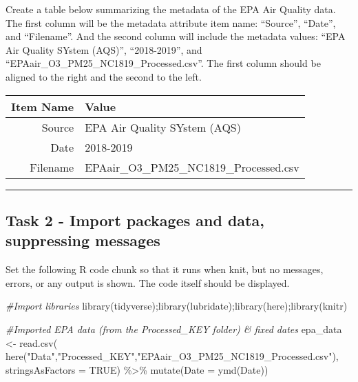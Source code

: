 \documentclass[
]{article}
\newenvironment{Shaded}{\begin{snugshade}}{\end{snugshade}}
\newcommand{\AttributeTok}[1]{\textcolor[rgb]{0.77,0.63,0.00}{#1}}
\newcommand{\CommentTok}[1]{\textcolor[rgb]{0.56,0.35,0.01}{\textit{#1}}}
\newcommand{\ConstantTok}[1]{\textcolor[rgb]{0.00,0.00,0.00}{#1}}
\newcommand{\FunctionTok}[1]{\textcolor[rgb]{0.00,0.00,0.00}{#1}}
\newcommand{\NormalTok}[1]{#1}
\newcommand{\OtherTok}[1]{\textcolor[rgb]{0.56,0.35,0.01}{#1}}
\newcommand{\SpecialCharTok}[1]{\textcolor[rgb]{0.00,0.00,0.00}{#1}}
\newcommand{\StringTok}[1]{\textcolor[rgb]{0.31,0.60,0.02}{#1}}
\begin{document}
Create a table below summarizing the metadata of the EPA Air Quality
data. The first column will be the metadata attribute item name:
``Source'', ``Date'', and ``Filename''. And the second column will
include the metadata values: ``EPA Air Quality SYstem (AQS)'',
``2018-2019'', and ``EPAair\_O3\_PM25\_NC1819\_Processed.csv''. The
first column should be aligned to the right and the second to the left.

\begin{longtable}[]{@{}rl@{}}
\toprule()
Item Name & Value \\
\midrule()
\endhead
Source & EPA Air Quality SYstem (AQS) \\
Date & 2018-2019 \\
Filename & EPAair\_O3\_PM25\_NC1819\_Processed.csv \\
\bottomrule()
\end{longtable}

\begin{center}\rule{0.5\linewidth}{0.5pt}\end{center}

\hypertarget{task-2---import-packages-and-data-suppressing-messages}{%
\subsection{Task 2 - Import packages and data, suppressing
messages}\label{task-2---import-packages-and-data-suppressing-messages}}

Set the following R code chunk so that it runs when knit, but no
messages, errors, or any output is shown. The code itself should be
displayed.

\begin{Shaded}
\begin{Highlighting}[]
\CommentTok{\#Import libraries}
\FunctionTok{library}\NormalTok{(tidyverse);}\FunctionTok{library}\NormalTok{(lubridate);}\FunctionTok{library}\NormalTok{(here);}\FunctionTok{library}\NormalTok{(knitr)}

\CommentTok{\#Imported EPA data (from the Processed\_KEY folder) \& fixed dates}
\NormalTok{epa\_data }\OtherTok{\textless{}{-}} \FunctionTok{read.csv}\NormalTok{(}
  \FunctionTok{here}\NormalTok{(}\StringTok{"Data"}\NormalTok{,}\StringTok{"Processed\_KEY"}\NormalTok{,}\StringTok{"EPAair\_O3\_PM25\_NC1819\_Processed.csv"}\NormalTok{),}
  \AttributeTok{stringsAsFactors =} \ConstantTok{TRUE}\NormalTok{) }\SpecialCharTok{\%\textgreater{}\%} 
  \FunctionTok{mutate}\NormalTok{(}\AttributeTok{Date =} \FunctionTok{ymd}\NormalTok{(Date))}
\end{Highlighting}
\end{Shaded}
\end{document}

